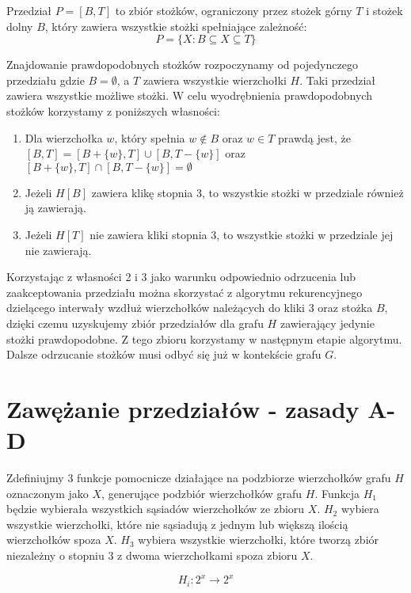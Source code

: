 \begin{definition}
Przedział $ P = [B, T]$ to zbiór stożków, ograniczony przez stożek górny $T$ i stożek dolny $B$, który zawiera wszystkie stożki spełniające zależność:  $$P=\{X: B \subseteq X \subseteq T\}$$ 
\end{definition}


Znajdowanie prawdopodobnych stożków rozpoczynamy od pojedynczego przedziału gdzie $B = \emptyset$, a $T$ zawiera wszystkie wierzchołki $H$. Taki przedział zawiera wszystkie możliwe stożki. W celu wyodrębnienia prawdopodobnych stożków korzystamy z poniższych własności:
\begin{enumerate}
\item Dla wierzchołka $w$, który spełnia $w \notin B$ oraz $w\in T$ prawdą jest, że $[B, T] = [B + \{ w\}, T] \cup [B , T - \{ w\}]$ oraz $[B +\{ w\}, T] \cap [B , T - \{ w\}] = \emptyset$

\item Jeżeli $H[B]$ zawiera klikę stopnia 3, to wszystkie stożki w przedziale również ją zawierają. 

\item Jeżeli $H[T]$ nie zawiera kliki stopnia 3, to wszystkie stożki w przedziale jej nie zawierają.
\end{enumerate}

Korzystając z własności 2 i 3 jako warunku odpowiednio odrzucenia lub zaakceptowania przedziału można skorzystać z algorytmu rekurencyjnego dzielącego interwały wzdłuż wierzchołków należących do kliki 3 oraz stożka $B$, dzięki czemu uzyskujemy zbiór przedziałów dla grafu $H$ zawierający jedynie stożki prawdopodobne. Z tego zbioru korzystamy w następnym etapie algorytmu.
Dalsze odrzucanie stożków musi odbyć się już w kontekście grafu $G$.
  

\section{Zawężanie przedziałów - zasady A-D}
Zdefiniujmy 3 funkcje pomocnicze działające na podzbiorze wierzchołków grafu $H$ oznaczonym jako $X$, generujące podzbiór wierzchołków grafu $H$. 
Funkcja $H_1$ będzie wybierała wszystkich sąsiadów wierzchołków ze zbioru $X$.
$H_2$ wybiera wszystkie wierzchołki, które nie sąsiadują z jednym lub większą ilością wierzchołków spoza $X$. 
$H_3$ wybiera wszystkie wierzchołki, które tworzą zbiór niezależny o stopniu 3 z dwoma wierzchołkami spoza zbioru $X$.

$$H_i: 2^x \to 2^x$$

